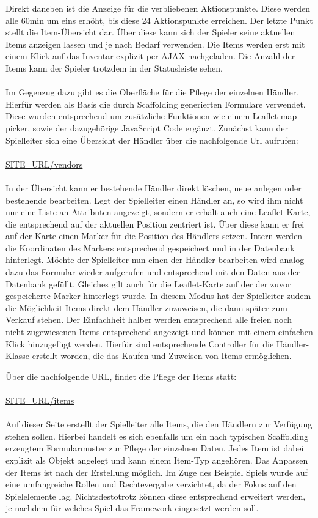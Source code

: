 Direkt daneben ist die Anzeige für die verbliebenen Aktionspunkte. Diese werden alle 60min um eins erhöht, bis diese 24 Aktionspunkte erreichen. Der letzte Punkt stellt die Item-Übersicht dar. Über diese kann sich der Spieler seine aktuellen Items anzeigen lassen und je nach Bedarf  verwenden. Die Items werden erst mit einem Klick auf das Inventar explizit per AJAX nachgeladen. Die Anzahl der Items kann der Spieler trotzdem in der Statusleiste sehen.
\\\\
Im Gegenzug dazu gibt es die Oberfläche für die Pflege der einzelnen Händler. Hierfür werden als Basis die durch Scaffolding generierten Formulare verwendet. Diese wurden entsprechend um zusätzliche Funktionen wie einem Leaflet map picker, sowie der dazugehörige JavaScript Code ergänzt. Zunächst kann der Spielleiter sich eine Übersicht der Händler über die nachfolgende Url aufrufen:
\\\\
\url{SITE\_URL/vendors}
\\\\
In der Übersicht kann er bestehende Händler direkt löschen, neue anlegen oder bestehende bearbeiten. 
Legt der Spielleiter einen Händler an, so wird ihm nicht nur eine Liste an Attributen angezeigt, sondern er erhält auch eine Leaflet Karte, die entsprechend auf der aktuellen Position zentriert ist. Über diese kann er frei auf der Karte einen Marker für die Position des Händlers setzen. Intern werden die Koordinaten des Markers entsprechend gespeichert und in der Datenbank hinterlegt. Möchte der Spielleiter nun einen der Händler bearbeiten wird analog dazu das Formular wieder aufgerufen und entsprechend mit den Daten aus der Datenbank gefüllt. Gleiches gilt auch für die Leaflet-Karte auf der der zuvor gespeicherte Marker hinterlegt wurde. In diesem Modus hat der Spielleiter zudem die Möglichkeit Items direkt dem Händler zuzuweisen, die dann später zum Verkauf stehen. Der Einfachheit halber werden entsprechend alle freien noch nicht zugewiesenen Items entsprechend angezeigt und können mit einem einfachen Klick hinzugefügt werden. Hierfür sind entsprechende Controller für die Händler-Klasse erstellt worden, die das Kaufen und Zuweisen von Items ermöglichen.

Über die nachfolgende URL, findet die Pflege der Items statt:
\\\\
\url{SITE\_URL/items}
\\\\
Auf dieser Seite erstellt der Spielleiter alle Items, die den Händlern zur Verfügung stehen sollen. Hierbei handelt es sich ebenfalls um ein nach typischen Scaffolding erzeugtem Formularmuster zur Pflege der einzelnen Daten. Jedes Item ist dabei explizit als Objekt angelegt und kann einem Item-Typ angehören. Das Anpassen der Items ist nach der Erstellung möglich. Im Zuge des Beispiel Spiels wurde auf eine umfangreiche Rollen und Rechtevergabe verzichtet, da der Fokus auf den Spielelemente lag. Nichtsdestotrotz können diese entsprechend erweitert werden, je nachdem für welches Spiel das Framework eingesetzt werden soll.

